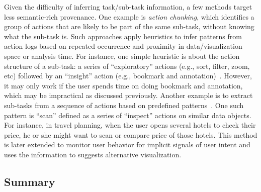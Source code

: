 Given the difficulty of inferring task/sub-task information, a few methods target less semantic-rich provenance. One example is \emph{action chunking}, which identifies a group of actions that are likely to be part of the same sub-task, without knowing what the sub-task is. Such approaches apply heuristics to infer patterns from action logs based on repeated occurrence and proximity in data/visualization space or analysis time. For instance, one simple heuristic is about the action structure of a sub-task: a series of ``exploratory'' actions (e.g., sort, filter, zoom, etc) followed by an ``insight'' action (e.g., bookmark and annotation)~\cite{Gotz2009}. However, it may only work if the user spends time on doing bookmark and annotation, which may be impractical as discussed previously. Another example is to extract sub-tasks from a sequence of actions based on predefined patterns~\cite{Gotz2009b}. One such pattern is ``scan'' defined as a series of ``inspect'' actions on similar data objects. For instance, in travel planning, when the user opens several hotels to check their price, he or she might want to scan or compare price of those hotels. This method is later extended to monitor user behavior for implicit signals of user intent and uses the information to suggests alternative visualization. 


\subsection{Summary}

